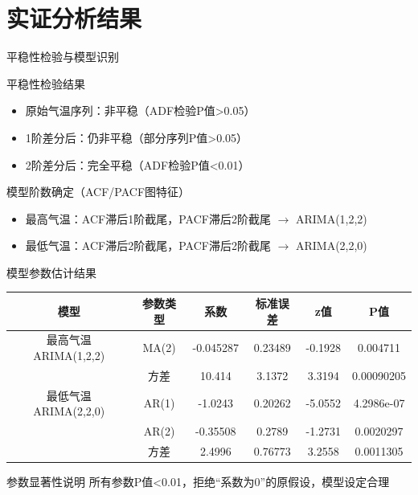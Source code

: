 \section{实证分析结果}
\begin{frame}{平稳性检验与模型识别}
    \begin{block}{平稳性检验结果}
        \begin{itemize}
            \item 原始气温序列：非平稳（ADF检验P值>0.05）
            \item 1阶差分后：仍非平稳（部分序列P值>0.05）
            \item 2阶差分后：完全平稳（ADF检验P值<0.01）
        \end{itemize}
    \end{block}
    \begin{block}{模型阶数确定（ACF/PACF图特征）}
        \begin{itemize}
            \item 最高气温：ACF滞后1阶截尾，PACF滞后2阶截尾 $\to$ ARIMA(1,2,2)
            \item 最低气温：ACF滞后2阶截尾，PACF滞后2阶截尾 $\to$ ARIMA(2,2,0)
        \end{itemize}
    \end{block}
\end{frame}

\begin{frame}{模型参数估计结果}
    \centering
    \begin{tabular}{|c|c|c|c|c|c|}
        \hline
        模型 & 参数类型 & 系数 & 标准误差 & z值 & P值 \\
        \hline
        最高气温ARIMA(1,2,2) & MA(2) & -0.045287 & 0.23489 & -0.1928 & 0.004711 \\
        & 方差 & 10.414 & 3.1372 & 3.3194 & 0.00090205 \\
        \hline
        最低气温ARIMA(2,2,0) & AR(1) & -1.0243 & 0.20262 & -5.0552 & 4.2986e-07 \\
        & AR(2) & -0.35508 & 0.2789 & -1.2731 & 0.0020297 \\
        & 方差 & 2.4996 & 0.76773 & 3.2558 & 0.0011305 \\
        \hline
    \end{tabular}
    \vspace{1em}
    \begin{block}{参数显著性说明}
        所有参数P值<0.01，拒绝“系数为0”的原假设，模型设定合理
    \end{block}
\end{frame}

